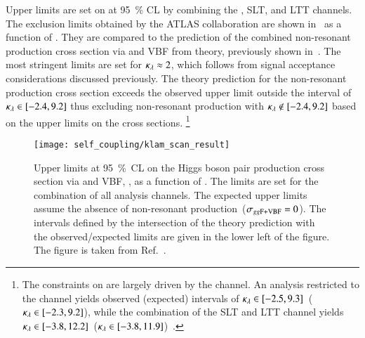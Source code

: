 Upper limits are set on \xsecggfvbf at \SI{95}{\percent} CL by combining the
\hadhad, \lephad SLT, and \lephad LTT channels. The exclusion limits obtained by
the ATLAS collaboration are shown in~ as a function of
\klambda. They are compared to the prediction of the combined non-resonant \HH
production cross section via \ggF and VBF from theory, previously shown
in~. The most stringent limits are set for
$\kappa_{\lambda} \approx 2$, which follows from signal acceptance considerations
discussed previously. The theory prediction for the non-resonant \HH production
cross section exceeds the observed upper limit outside the interval of
\mbox{$\kappa_{\lambda} \in [-2.4, 9.2]$} thus excluding non-resonant \HH production
with \mbox{$\kappa_{\lambda} \notin [-2.4, 9.2]$} based on the upper limits on the cross
sections.%
\footnote{The constraints on \klambda are largely driven by the \hadhad
  channel. An analysis restricted to the \hadhad channel yields observed
  (expected) \klambda intervals of $\kappa_{\lambda} \in [ -2.5, 9.3
  ]$~($\kappa_{\lambda} \in [ -2.3, 9.2 ]$), while the combination of the \lephad SLT
  and LTT channel yields $\kappa_{\lambda} \in [ -3.8, 12.2
  ]$~($\kappa_{\lambda} \in [ -3.8, 11.9 ]$)~\cite{Dimitriadi}.}

\begin{figure}[htbp]
  \centering

  \texttt{[image: self\_coupling/klam\_scan\_result]}


  \caption[Upper limits at \SI{95}{\percent}~CL on the Higgs boson pair
  production cross section as a function of \klambda.]{Upper limits at
    \SI{95}{\percent}~CL on the Higgs boson pair production cross section via
    \ggF and VBF, \xsecggfvbf, as a function of \klambda. The limits are set for
    the combination of all analysis channels. The expected upper limits assume
    the absence of non-resonant \HH production~($\sigma_{gg\text{F+VBF}} = 0$). The \klambda
    intervals defined by the intersection of the theory prediction with the
    observed/expected limits are given in the lower left of the figure. The
    figure is taken from Ref.~\cite{ATLAS-CONF-2021-052}.}%
  \label{fig:klambda_scan}
\end{figure}

